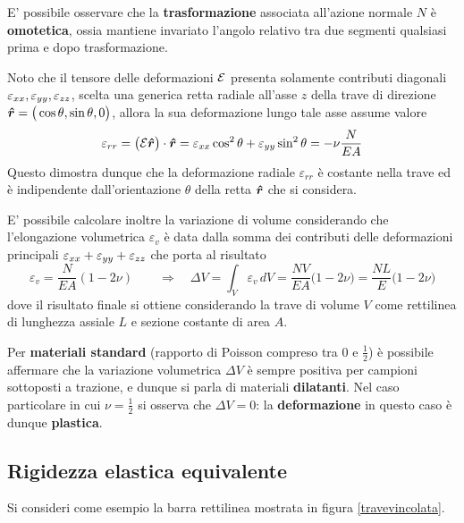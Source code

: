 	\begin{concetto}
		E' possibile osservare che la \textbf{trasformazione} associata all'azione normale $N$ è \textbf{omotetica}, ossia mantiene invariato l'angolo relativo tra due segmenti qualsiasi prima e dopo trasformazione.		
	\end{concetto}
	\begin{dimostrazione}
		Noto che il tensore delle deformazioni $\mathcal E$ presenta solamente contributi diagonali $\varepsilon_{xx},\varepsilon_{yy},\varepsilon_{zz}$, scelta una generica retta radiale all'asse $z$ della trave di direzione $\boldsymbol{\hat{r}}= \big(\cos\theta,\sin\theta,0\big)$, allora la sua deformazione lungo tale asse assume valore
		\[ \varepsilon_{rr} = \big(\mathcal E \boldsymbol{\hat{r}}\big) \cdot \boldsymbol{\hat{r}} = \varepsilon_{xx} \cos^2\theta + \varepsilon_{yy}\sin^2\theta = - \nu \frac N{EA} \] 
		Questo dimostra dunque che la deformazione radiale $\varepsilon_{rr}$ è costante nella trave ed è indipendente dall'orientazione $\theta$ della retta $\boldsymbol{\hat{r}}$ che si considera.
	\end{dimostrazione}

	E' possibile calcolare inoltre la variazione di volume considerando che l'elongazione volumetrica $\varepsilon_v$ è data dalla somma dei contributi delle deformazioni principali $\varepsilon_{xx} + \varepsilon_{yy} + \varepsilon_{zz}$ che porta al risultato
	\[ \varepsilon_v = \frac N{EA} ( 1 -2\nu) \qquad \Rightarrow \quad \Delta V = \int_V \varepsilon_v \, dV = \frac{NV}{EA} \big(1-2\nu\big) = \frac {NL} E \big(1-2\nu\big) \]
	dove il risultato finale si ottiene considerando la trave di volume $V$ come rettilinea di lunghezza assiale $L$ e sezione costante di area $A$.
	
	\begin{osservazione}
		Per \textbf{materiali standard} (rapporto di Poisson compreso tra 0 e $\frac 1 2$) è possibile affermare che la variazione volumetrica $\Delta V$ è sempre positiva per campioni sottoposti a trazione, e dunque si parla di materiali \textbf{dilatanti}. Nel caso particolare in cui $\nu = \frac 1 2$ si osserva che $\Delta V = 0$: la \textbf{deformazione} in questo caso è dunque \textbf{plastica}.
	\end{osservazione}

	\subsection{Rigidezza elastica equivalente}
		Si consideri come esempio la barra rettilinea mostrata in figura \ref{travevincolata}.
		
